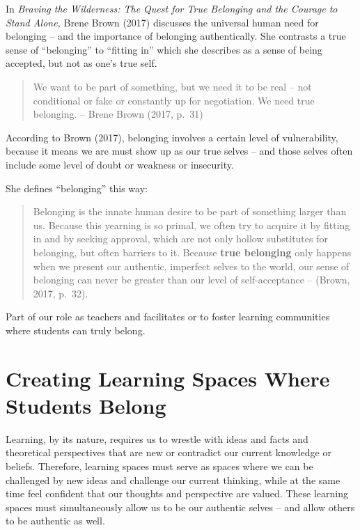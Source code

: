 \documentclass[
]{book}
\begin{document}
In \emph{Braving the Wilderness: The Quest for True Belonging and the Courage to Stand Alone,} Brene Brown (2017) discusses the universal human need for belonging -- and the importance of belonging authentically. She contrasts a true sense of ``belonging'' to ``fitting in'' which she describes as a sense of being accepted, but not as one's true self.

\begin{quote}
We want to be part of something, but we need it to be real -- not conditional or fake or constantly up for negotiation. We need true belonging. -- Brene Brown (2017, p.~31)
\end{quote}

According to Brown (2017), belonging involves a certain level of vulnerability, because it means we are must show up as our true selves -- and those selves often include some level of doubt or weakness or insecurity.

She defines ``belonging'' this way:

\begin{quote}
Belonging is the innate human desire to be part of something larger than us. Because this yearning is so primal, we often try to acquire it by fitting in and by seeking approval, which are not only hollow substitutes for belonging, but often barriers to it. Because \textbf{true belonging} only happens when we present our authentic, imperfect selves to the world, our sense of belonging can never be greater than our level of self-acceptance -- (Brown, 2017, p.~32).
\end{quote}

Part of our role as teachers and facilitates or to foster learning communities where students can truly belong.

\hypertarget{creating-learning-spaces-where-students-belong}{%
\section{Creating Learning Spaces Where Students Belong}\label{creating-learning-spaces-where-students-belong}}

Learning, by its nature, requires us to wrestle with ideas and facts and theoretical perspectives that are new or contradict our current knowledge or beliefs. Therefore, learning spaces must serve as spaces where we can be challenged by new ideas and challenge our current thinking, while at the same time feel confident that our thoughts and perspective are valued. These learning spaces must simultaneously allow us to be our authentic selves -- and allow others to be authentic as well.
\end{document}
